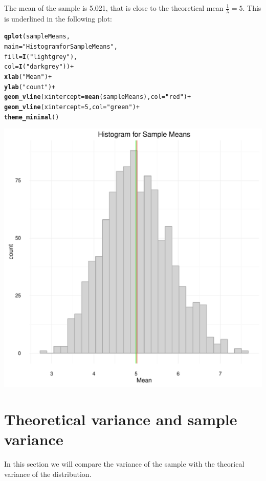 \documentclass[10pt]{article}\usepackage[]{graphicx}\usepackage[]{color}
\makeatletter
\newcommand{\hlnum}[1]{\textcolor[rgb]{0.686,0.059,0.569}{#1}}%
\newcommand{\hlstr}[1]{\textcolor[rgb]{0.192,0.494,0.8}{#1}}%
\newcommand{\hlopt}[1]{\textcolor[rgb]{0,0,0}{#1}}%
\newcommand{\hlstd}[1]{\textcolor[rgb]{0.345,0.345,0.345}{#1}}%
\newcommand{\hlkwc}[1]{\textcolor[rgb]{0.333,0.667,0.333}{#1}}%
\newcommand{\hlkwd}[1]{\textcolor[rgb]{0.737,0.353,0.396}{\textbf{#1}}}%
\newenvironment{kframe}{%
 \def\at@end@of@kframe{}%
 \ifinner\ifhmode%
  \def\at@end@of@kframe{\end{minipage}}%
  \begin{minipage}{\columnwidth}%
 \fi\fi%
 \def\FrameCommand##1{\hskip\@totalleftmargin \hskip-\fboxsep
 \colorbox{shadecolor}{##1}\hskip-\fboxsep
     \hskip-\linewidth \hskip-\@totalleftmargin \hskip\columnwidth}%
 \MakeFramed {\advance\hsize-\width
   \@totalleftmargin\z@ \linewidth\hsize
   \@setminipage}}%
 {\par\unskip\endMakeFramed%
 \at@end@of@kframe}
\newenvironment{knitrout}{}{} %
\makeatother
\begin{document}
The mean of the sample is 5.021, that is close to the theoretical mean $\frac{1}{\lambda} = 5$. This is underlined in the following plot:
\begin{knitrout}
\color{fgcolor}\begin{kframe}
\begin{alltt}
\hlkwd{qplot}\hlstd{(sampleMeans,}
         \hlkwc{main} \hlstd{=} \hlstr{"Histogram for Sample Means"}\hlstd{,}
         \hlkwc{fill}\hlstd{=}\hlkwd{I}\hlstd{(}\hlstr{"lightgrey"}\hlstd{),}
         \hlkwc{col}\hlstd{=}\hlkwd{I}\hlstd{(}\hlstr{"darkgrey"}\hlstd{))}\hlopt{+}
         \hlkwd{xlab}\hlstd{(}\hlstr{"Mean"}\hlstd{)}\hlopt{+}
         \hlkwd{ylab}\hlstd{(}\hlstr{"count"}\hlstd{)}\hlopt{+}
         \hlkwd{geom_vline}\hlstd{(}\hlkwc{xintercept} \hlstd{=} \hlkwd{mean}\hlstd{(sampleMeans),}\hlkwc{col}\hlstd{=}\hlstr{"red"}\hlstd{)}\hlopt{+}
         \hlkwd{geom_vline}\hlstd{(}\hlkwc{xintercept} \hlstd{=} \hlnum{5}\hlstd{,}\hlkwc{col} \hlstd{=} \hlstr{"green"}\hlstd{)}\hlopt{+}
         \hlkwd{theme_minimal}\hlstd{()}
\end{alltt}


{\ttfamily\noindent\itshape\color{messagecolor}{\#\# `stat\_bin()` using `bins = 30`. Pick better value with `binwidth`.}}\end{kframe}

{\centering \includegraphics[width=0.6\linewidth]{figure/minimal-mean-plots-1} 

}



\end{knitrout}


\section{Theoretical variance  and sample variance}
In this section we will compare the variance of the sample with the theorical variance of the distribution.
\end{document}
